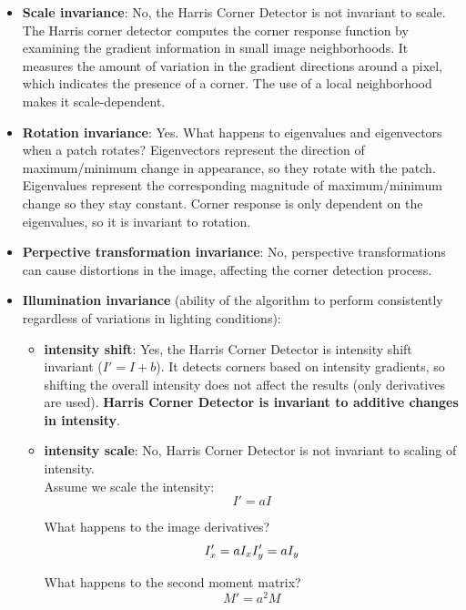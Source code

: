 \documentclass{article}
\begin{document}
\begin{itemize}
    \item \textbf{Scale invariance}: No, the Harris Corner Detector is not invariant to scale. The Harris corner detector computes the corner response function by examining the gradient information in small image neighborhoods. It measures the amount of variation in the gradient directions around a pixel, which indicates the presence of a corner. The use of a local neighborhood makes it scale-dependent.
    \item \textbf{Rotation invariance}: Yes. What happens to eigenvalues and eigenvectors when a patch rotates? Eigenvectors represent the direction of maximum/minimum change in appearance, so they rotate with the patch. Eigenvalues represent the corresponding magnitude of maximum/minimum change so they stay constant. Corner response is only dependent on the eigenvalues, so it is invariant to rotation. 
    \item \textbf{Perpective transformation invariance}: No, perspective transformations can cause distortions in the image, affecting the corner detection process.
    \item \textbf{Illumination invariance} (ability of the algorithm to perform consistently regardless of variations in lighting conditions):
    \begin{itemize}
        \item \textbf{intensity shift}: Yes, the Harris Corner Detector is intensity shift invariant ($I' = I + b$). It detects corners based on intensity gradients, so shifting the overall intensity does not affect the results (only derivatives are used). \textbf{Harris Corner Detector is invariant to additive changes in intensity}.
        \item \textbf{intensity scale}:  No, Harris Corner Detector is not invariant to scaling of intensity.\\

        Assume we scale the intensity:
        \begin{equation*}
            I' = aI
        \end{equation*}

        What happens to the image derivatives?
        \begin{equation*}
            I'_x = aI_x \\
            I'_y = aI_y
        \end{equation*}

        What happens to the second moment matrix?
        \begin{equation*}
            M' = a^2M
        \end{equation*}


\end{itemize}
\end{itemize}
\end{document}
